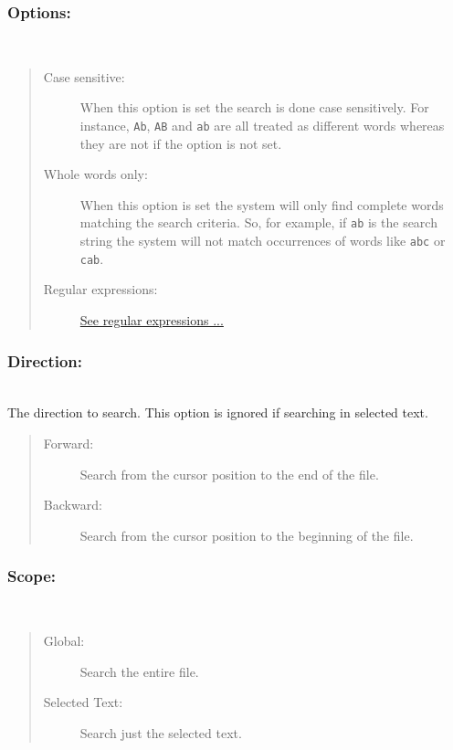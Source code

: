 \subsubsection{Options:}\\
\begin{quote}
  \begin{footnotesize}
    \begin{description}
      \item[Case sensitive:]
        When this option is set the search is done case sensitively. For instance,
        \texttt{Ab}, \texttt{AB} and \texttt{ab} are all treated as different words
        whereas they are not if the option is not set.
      \item[Whole words only:]
        When this option is set the system will only find complete words matching
        the search criteria. So, for example, if \texttt{ab} is the search string
        the system will not match occurrences of words like \texttt{abc} or
        \texttt{cab}.
      \item[Regular expressions:]
        \href{\#working\_regularexpressions}{See regular expressions ...}
    \end{description}
  \end{footnotesize}
\end{quote}


\subsubsection{Direction:}\\
The direction to search. This option is ignored if searching in selected text.

\begin{quote}
  \begin{footnotesize}
    \begin{description}
      \item[Forward:]
        Search from the cursor position to the end of the file.
      \item[Backward:]
        Search from the cursor position to the beginning of the file.
    \end{description}
  \end{footnotesize}
\end{quote}

\subsubsection{Scope:}\\
\begin{quote}
  \begin{footnotesize}
    \begin{description}
      \item[Global:]
        Search the entire file.
      \item[Selected Text:]
        Search just the selected text.
    \end{description}
  \end{footnotesize}
\end{quote}

